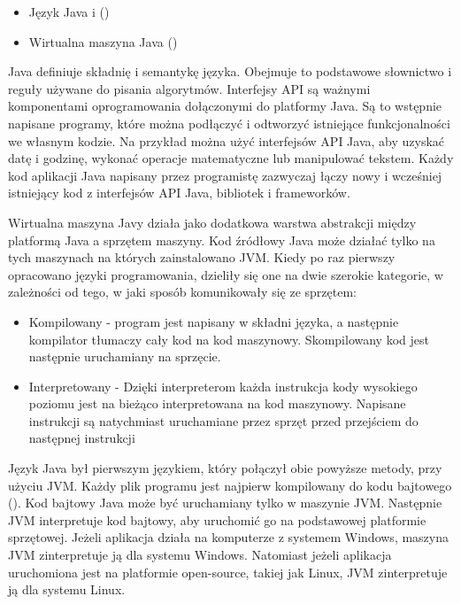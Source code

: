 \begin{itemize}
    \item Język Java i ()
    \item Wirtualna maszyna Java  ()
\end{itemize}

Java definiuje składnię i semantykę języka. Obejmuje to podstawowe słownictwo i reguły używane do pisania algorytmów. 
Interfejsy API są ważnymi komponentami oprogramowania dołączonymi do platformy Java. Są to wstępnie napisane programy, które można podłączyć i odtworzyć istniejące funkcjonalności we własnym kodzie. Na przykład można użyć interfejsów API Java, aby uzyskać datę i godzinę, wykonać operacje matematyczne lub manipulować tekstem. Każdy kod aplikacji Java napisany przez programistę zazwyczaj łączy nowy i wcześniej istniejący kod z interfejsów API Java, bibliotek i frameworków\cite{frameworkDef}\cite{javaAmazon}\cite{javaDEV}.

Wirtualna maszyna Javy działa jako dodatkowa warstwa abstrakcji między platformą Java a sprzętem maszyny. Kod źródłowy Java może działać tylko na tych maszynach na których zainstalowano JVM. Kiedy po raz pierwszy opracowano języki programowania, dzieliły się one na dwie szerokie kategorie, w zależności od tego, w jaki sposób komunikowały się ze sprzętem: 

\begin{itemize}
    \item Kompilowany - program jest napisany w składni języka, a następnie kompilator tłumaczy cały kod na kod maszynowy. Skompilowany kod jest następnie uruchamiany na sprzęcie.
    \item Interpretowany - Dzięki interpreterom każda instrukcja kody wysokiego poziomu jest na bieżąco interpretowana na kod maszynowy. Napisane instrukcji są natychmiast uruchamiane przez sprzęt przed przejściem do następnej instrukcji
\end{itemize}

Język Java był pierwszym językiem, który połączył obie powyższe metody, przy użyciu JVM. Każdy plik programu jest najpierw kompilowany do kodu bajtowego (). Kod bajtowy Java może być uruchamiany tylko w maszynie JVM. Następnie JVM interpretuje kod bajtowy, aby uruchomić go na podstawowej platformie sprzętowej. Jeżeli aplikacja działa na komputerze z systemem Windows, maszyna JVM zinterpretuje ją dla systemu Windows. Natomiast jeżeli aplikacja uruchomiona jest na platformie open-source, takiej jak Linux, JVM zinterpretuje ją dla systemu Linux\cite{javaAmazon}\cite{javaDEV}.

